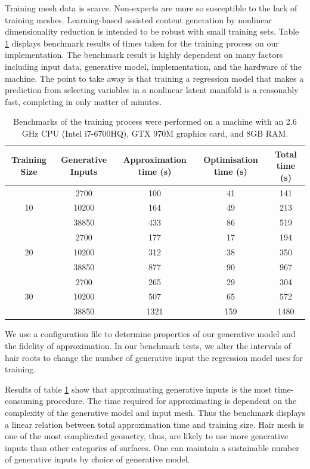\documentclass[ %
author={Dillon Keith Diep},
supervisor={Dr. Carl Henrik Ek},
degree={MEng},
title={ART-CG Hair:},
subtitle={Assisted Real-time Content Generation of Stylised Virtual Hair},
type={Research},
year={2017} ]{dissertation}
\begin{document}
	Training mesh data is scarce. Non-experts are more so susceptible to the lack of training meshes. Learning-based assisted content generation by nonlinear dimensionality reduction is intended to be robust with small training sets. Table \ref{trainingbenchmarks} displays benchmark results of times taken for the training process on our implementation. The benchmark result is highly dependent on many factors including input data, generative model, implementation, and the hardware of the machine. The point to take away is that training a regression model that makes a prediction from selecting variables in a nonlinear latent manifold is a reasonably fast, completing in only matter of minutes.
	
	\begin{table}[!h]
		\centering
		\begin{tabular}{|c|c|c|c|c|}
			\hline
			Training Size & Generative Inputs & Approximation time (s)  & Optimisation time (s) &   Total time (s)\\
			\hline
			\multirow{3}{*}{10}
			& 2700  & 100       & 41        & 141\\
			& 10200 & 164       & 49        & 213\\
			& 38850 & 433       & 86        & 519\\
			\hline
			\multirow{3}{*}{20}
			& 2700  & 177       & 17        & 194\\
			& 10200 & 312       & 38        & 350\\
			& 38850 & 877       & 90        & 967\\
			\hline
			\multirow{3}{*}{30}
			& 2700  & 265       & 29        & 304\\
			& 10200 & 507       & 65        & 572\\
			& 38850 & 1321      & 159       & 1480\\
			\hline
		\end{tabular}
		\caption{Benchmarks of the training process were performed on a machine with an 2.6 GHz CPU (Intel i7-6700HQ), GTX 970M graphics card, and 8GB RAM. }
		\label{trainingbenchmarks}
	\end{table}
	
	We use a configuration file to determine properties of our generative model and the fidelity of approximation. In our benchmark tests, we alter the intervals of hair roots to change the number of generative input the regression model uses for training.
	
	Results of table \ref{trainingbenchmarks} show that approximating generative inputs is the most time-consuming procedure. The time required for approximating is dependent on the complexity of the generative model and input mesh. Thus the benchmark displays a linear relation between total approximation time and training size. Hair mesh is one of the most complicated geometry, thus, are likely to use more generative inputs than other categories of surfaces. One can maintain a sustainable number of generative inputs by choice of generative model.
	
\end{document}
